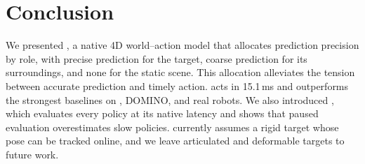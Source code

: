 \section{Conclusion}
\label{sec:conclusion}

We presented \ours, a native 4D world--action model that allocates prediction precision
by role, with precise prediction for the target, coarse prediction for its surroundings,
and none for the static scene. This allocation alleviates the tension between accurate
prediction and timely action. \ours acts in 15.1\,ms and outperforms the strongest
baselines on \bench, DOMINO, and real robots. We also introduced \bench, which evaluates
every policy at its native latency and shows that paused evaluation overestimates slow
policies. \ours currently assumes a rigid target whose pose can be tracked online, and
we leave articulated and deformable targets to future work.
